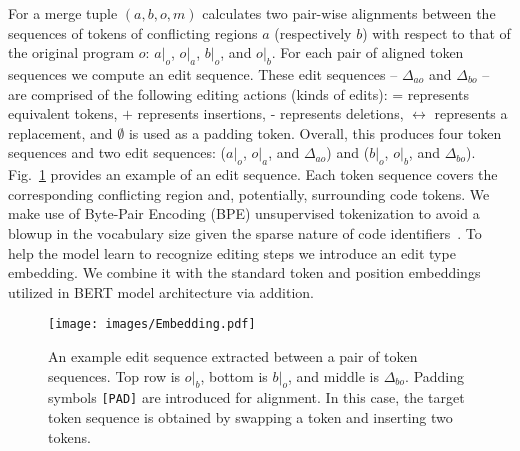 For a merge tuple $(a, b, o, m)$ \thistool{} calculates two pair-wise alignments between the sequences of tokens of conflicting regions $a$ (respectively $b$) with respect to that of the original program $o$: $a|_o$, $o|_a$, $b|_o$, and $o|_b$. For each pair of aligned token sequences we compute an edit sequence. These edit sequences -- $\Delta_{ao}$ and $\Delta_{bo}$ -- are comprised of the following editing actions (kinds of edits): $\textbf{=}$ represents equivalent tokens, $\textbf{+}$ represents insertions, $\textbf{-}$ represents deletions,
$\boldsymbol{\leftrightarrow}$ represents a replacement, and
$\boldsymbol{\emptyset}$ is used as a padding token. Overall, this produces four token sequences and two edit sequences: ($a|_{o}$,
$o|_{a}$, and $\Delta_{ao}$) and ($b|_{o}$, $o|_{b}$, and $\Delta_{bo}$). Fig.~\ref{fig:embedding} provides an example of an edit sequence. Each token sequence covers the corresponding conflicting region and, potentially, surrounding code tokens. We make use of Byte-Pair Encoding (BPE) unsupervised tokenization to avoid a blowup in the vocabulary size given the sparse nature of code identifiers~\cite{10.1145/3377811.3380342}.
To help the model learn to recognize editing steps we introduce an edit type embedding. We combine it with the standard token and position embeddings utilized in BERT model architecture via addition. 
\begin{figure}
\begin{center}
    \texttt{[image: images/Embedding.pdf]}
\caption{An example edit sequence extracted between a pair of token sequences.  Top row is $o|_b$, bottom is $b|_o$, and middle is $\Delta_{bo}$. Padding symbols \texttt{[PAD]} are introduced for alignment. In this case, the target token sequence is obtained by swapping a token and inserting two tokens.}
\label{fig:embedding}
\end{center}
\vspace{-12pt}
\end{figure}


